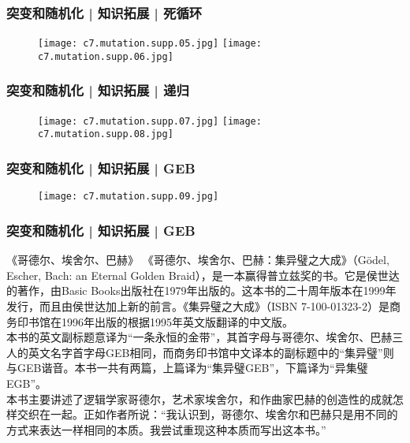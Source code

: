 \begin{frame}
  \frametitle{突变和随机化 | 知识拓展 | 死循环}
  \begin{figure}
    \centering
    \texttt{[image: c7.mutation.supp.05.jpg]}\quad
    \texttt{[image: c7.mutation.supp.06.jpg]}
  \end{figure}
\end{frame}

\begin{frame}
  \frametitle{突变和随机化 | 知识拓展 | 递归}
  \begin{figure}
    \centering
    \texttt{[image: c7.mutation.supp.07.jpg]}\quad
    \texttt{[image: c7.mutation.supp.08.jpg]}
  \end{figure}
\end{frame}

\begin{frame}
  \frametitle{突变和随机化 | 知识拓展 | GEB}
  \begin{figure}
    \centering
    \texttt{[image: c7.mutation.supp.09.jpg]}
  \end{figure}
\end{frame}

\begin{frame}
  \frametitle{突变和随机化 | 知识拓展 | GEB}
  \begin{block}{《哥德尔、埃舍尔、巴赫》}
    《哥德尔、埃舍尔、巴赫：集异璧之大成》（Gödel, Escher, Bach: an Eternal Golden Braid），是一本赢得普立兹奖的书。它是侯世达的著作，由Basic Books出版社在1979年出版的。这本书的二十周年版本在1999年发行，而且由侯世达加上新的前言。《集异璧之大成》（ISBN 7-100-01323-2）是商务印书馆在1996年出版的根据1995年英文版翻译的中文版。\\
    \vspace{0.3em}
本书的英文副标题意译为“一条永恒的金带”，其首字母与哥德尔、埃舍尔、巴赫三人的英文名字首字母GEB相同，而商务印书馆中文译本的副标题中的“集异璧”则与GEB谐音。本书一共有两篇，上篇译为“集异璧GEB”，下篇译为“异集璧EGB”。 \\
    \vspace{0.3em}
本书主要讲述了逻辑学家哥德尔，艺术家埃舍尔，和作曲家巴赫的创造性的成就怎样交织在一起。正如作者所说：“我认识到，哥德尔、埃舍尔和巴赫只是用不同的方式来表达一样相同的本质。我尝试重现这种本质而写出这本书。”
  \end{block}
\end{frame}

